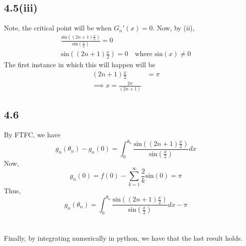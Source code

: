 \documentclass[letterpaper,12pt]{article}
\theoremstyle{definition}
\begin{document}
\subsection*{4.5(iii)}
Note, the critical point will be when $G_n'(x) = 0$. Now, by (ii),
\begin{align*}
    \frac{\text{sin} \left( (2n+1)\frac{x}{2} \right) }{\text{sin} (\frac{x}{2}) } = 0\\
    \text{sin} \left( (2n+1)\frac{x}{2} \right) = 0 \quad \text{where sin$(x)\neq 0$}
\end{align*}
The first instance in which this will happen will be
\begin{align*}
(2n+1) \frac{x}{2} & = \pi\\
\implies x = \frac{2\pi}{(2n+1)}
\end{align*}



\subsection*{4.6}


By FTFC, we have 
\[
g_n(\theta_n) - g_n(0) = \int^{\theta_n}_0 \frac{\text{sin} \left( (2n+1)\frac{x}{2} \right)}{\text{sin} (\frac{x}{2})} dx
\]
Now, 
\[g_n(0) = f(0) - \sum^\infty_{k=1} \frac{2}{k} \text{sin}(0) = \pi\]
Thus, 
\[
g_n(\theta_n) = \int^{\theta_n}_0 \frac{\text{sin} \left( (2n+1)\frac{x}{2} \right)}{\text{sin} (\frac{x}{2})} dx - \pi
\]
\\\\
Finally, by integrating numerically in python, we have that the last result holds.
\end{document}

